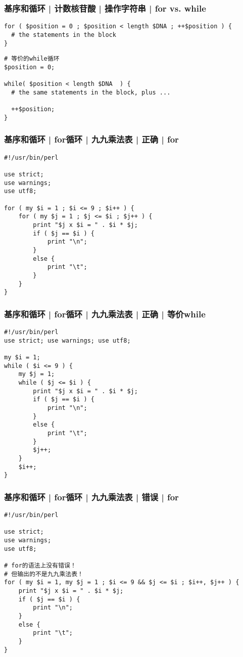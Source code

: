 \begin{frame}[fragile]
  \frametitle{基序和循环 | 计数核苷酸 | 操作字符串 | \alert{for vs. while}}
\begin{lstlisting}
for ( $position = 0 ; $position < length $DNA ; ++$position ) {
  # the statements in the block
}
\end{lstlisting}
\pause
\begin{lstlisting}
# 等价的while循环
$position = 0;

while( $position < length $DNA  ) {
  # the same statements in the block, plus ...

  ++$position;
}
\end{lstlisting}
\end{frame}

\begin{frame}[fragile]
  \frametitle{基序和循环 | for循环 | 九九乘法表 | 正确 | for}
\begin{lstlisting}[basicstyle=\small\tt,numberstyle=\footnotesize]
#!/usr/bin/perl 

use strict;
use warnings;
use utf8;

for ( my $i = 1 ; $i <= 9 ; $i++ ) {
    for ( my $j = 1 ; $j <= $i ; $j++ ) {
        print "$j x $i = " . $i * $j;
        if ( $j == $i ) {
            print "\n";
        }
        else {
            print "\t";
        }
    }
}
\end{lstlisting}
\end{frame}

\begin{frame}[fragile]
  \frametitle{基序和循环 | for循环 | 九九乘法表 | 正确 | 等价while}
\begin{lstlisting}[basicstyle=\small\tt,numberstyle=\footnotesize]
#!/usr/bin/perl 
use strict; use warnings; use utf8;

my $i = 1;
while ( $i <= 9 ) {
    my $j = 1;
    while ( $j <= $i ) {
        print "$j x $i = " . $i * $j;
        if ( $j == $i ) {
            print "\n";
        }
        else {
            print "\t";
        }
        $j++;
    }
    $i++;
}
\end{lstlisting}
\end{frame}

\begin{frame}[fragile]
  \frametitle{基序和循环 | for循环 | 九九乘法表 | 错误 | for}
\begin{lstlisting}[basicstyle=\small\tt,numberstyle=\footnotesize]
#!/usr/bin/perl 

use strict;
use warnings;
use utf8;

# for的语法上没有错误！
# 但输出的不是九九乘法表！
for ( my $i = 1, my $j = 1 ; $i <= 9 && $j <= $i ; $i++, $j++ ) {
    print "$j x $i = " . $i * $j;
    if ( $j == $i ) {
        print "\n";
    }
    else {
        print "\t";
    }
}
\end{lstlisting}
\end{frame}

